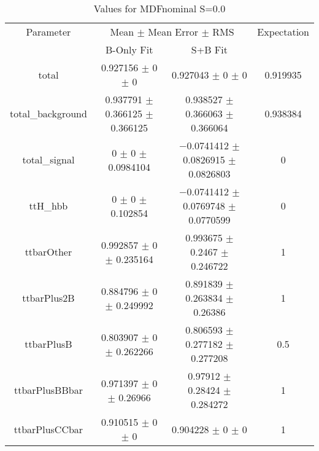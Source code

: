 \begin{table}
\centering
\caption{Values for MDFnominal S=0.0}
\begin{tabular}{cccc}
\toprule
Parameter & \multicolumn{2}{c}{Mean $\pm$ Mean Error $\pm$ RMS} & Expectation\\
 & B-Only Fit & S+B Fit & \\
\midrule
total & \num{0.927156} $\pm$ \num{0} $\pm$ \num{0} & \num{0.927043} $\pm$ \num{0} $\pm$ \num{0} & \num{0.919935}\\
total\_background & \num{0.937791} $\pm$ \num{0.366125} $\pm$ \num{0.366125} & \num{0.938527} $\pm$ \num{0.366063} $\pm$ \num{0.366064} & \num{0.938384}\\
total\_signal & \num{0} $\pm$ \num{0} $\pm$ \num{0.0984104} & \num{-0.0741412} $\pm$ \num{0.0826915} $\pm$ \num{0.0826803} & \num{0}\\
ttH\_hbb & \num{0} $\pm$ \num{0} $\pm$ \num{0.102854} & \num{-0.0741412} $\pm$ \num{0.0769748} $\pm$ \num{0.0770599} & \num{0}\\
ttbarOther & \num{0.992857} $\pm$ \num{0} $\pm$ \num{0.235164} & \num{0.993675} $\pm$ \num{0.2467} $\pm$ \num{0.246722} & \num{1}\\
ttbarPlus2B & \num{0.884796} $\pm$ \num{0} $\pm$ \num{0.249992} & \num{0.891839} $\pm$ \num{0.263834} $\pm$ \num{0.26386} & \num{1}\\
ttbarPlusB & \num{0.803907} $\pm$ \num{0} $\pm$ \num{0.262266} & \num{0.806593} $\pm$ \num{0.277182} $\pm$ \num{0.277208} & \num{0.5}\\
ttbarPlusBBbar & \num{0.971397} $\pm$ \num{0} $\pm$ \num{0.26966} & \num{0.97912} $\pm$ \num{0.28424} $\pm$ \num{0.284272} & \num{1}\\
ttbarPlusCCbar & \num{0.910515} $\pm$ \num{0} $\pm$ \num{0} & \num{0.904228} $\pm$ \num{0} $\pm$ \num{0} & \num{1}\\
\bottomrule
\end{tabular}
\end{table}